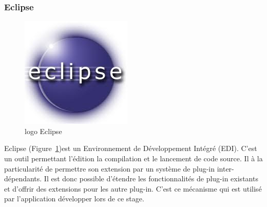 \documentclass{article}
\begin{document}
	\subsubsection{Eclipse}
		\begin{figure}[!h]
		  \raggedright
		  \includegraphics[scale=0.3]{img/logo_eclipse.jpeg}
		  \caption{logo Eclipse}
		  \label{logo_eclipse}
		\end{figure}
		Eclipse (Figure~\ref{logo_eclipse})est un Environnement de Développement Intégré (EDI). C'est un outil permettant l'édition la compilation et le lancement de code source. Il à la particularité de permettre son extension par un système de plug-in inter-dépendants. Il est donc possible d'étendre les fonctionnalités de plug-in existants et d'offrir des extensions pour les autre plug-in. C'est ce mécanisme qui est utilisé par l'application développer lors de ce stage.
\end{document}
